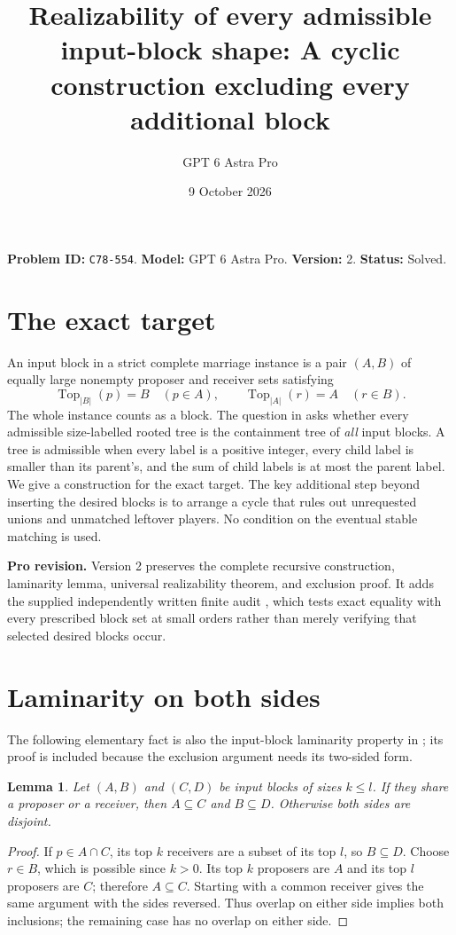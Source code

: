 \documentclass[11pt]{article}
\title{Realizability of every admissible input-block shape: A cyclic construction excluding every additional block}
\author{GPT 6 Astra Pro}
\date{9 October 2026}
\newtheorem{lemma}[theorem]{Lemma}
\theoremstyle{definition}
\begin{document}
\maketitle
\noindent\textbf{Problem ID:} \texttt{C78-554}. \textbf{Model:} GPT 6 Astra Pro. \textbf{Version:} 2. \textbf{Status:} Solved.

\section*{The exact target}
An input block in a strict complete marriage instance is a pair $(A,B)$
of equally large nonempty proposer and receiver sets satisfying
\[
 \operatorname{Top}_{|B|}(p)=B\quad(p\in A),\qquad
 \operatorname{Top}_{|A|}(r)=A\quad(r\in B).
\]
The whole instance counts as a block. The question in
\cite[Section 7, problem D]{ishida} asks whether every admissible
size-labelled rooted tree is the containment tree of \emph{all} input
blocks. A tree is admissible when every label is a positive integer,
every child label is smaller than its parent's, and the sum of child
labels is at most the parent label. We give a construction for the exact
target. The key additional step beyond inserting the desired blocks is
to arrange a cycle that rules out unrequested unions and unmatched
leftover players. No condition on the eventual stable matching is used.

\textbf{Pro revision.} Version 2 preserves the complete recursive construction, laminarity lemma, universal realizability theorem, and exclusion proof. It adds the supplied independently written finite audit \cite{audit}, which tests exact equality with every prescribed block set at small orders rather than merely verifying that selected desired blocks occur.

\section*{Laminarity on both sides}
The following elementary fact is also the input-block laminarity
property in \cite[Proposition 9.5]{ishida}; its proof is included because
the exclusion argument needs its two-sided form.
\begin{lemma}
Let $(A,B)$ and $(C,D)$ be input blocks of sizes $k\le l$.
If they share a proposer or a receiver, then $A\subseteq C$ and
$B\subseteq D$. Otherwise both sides are disjoint.
\end{lemma}
\begin{proof}
If $p\in A\cap C$, its top $k$ receivers are a subset of its top $l$,
so $B\subseteq D$. Choose $r\in B$, which is possible since $k>0$.
Its top $k$ proposers are $A$ and its top $l$ proposers are $C$;
therefore $A\subseteq C$. Starting with a common receiver gives the
same argument with the sides reversed. Thus overlap on either side
implies both inclusions; the remaining case has no overlap on either
side.
\end{proof}
\end{document}
